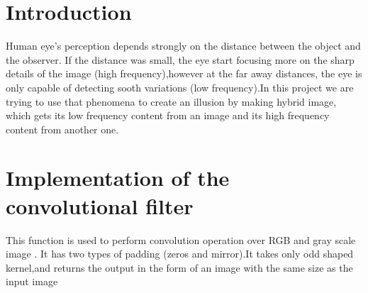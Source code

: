 \lstset{style=mystyle, language=python , frame=single}



\maketitle	

\vspace{-3cm}
\thispagestyle{fancy}


\section*{Introduction}


Human eye's perception depends strongly on the distance between the object and the observer. If the distance was small, the eye start focusing more on the sharp details of the image (high frequency),however at the far away distances, the eye is only capable of detecting sooth variations (low frequency).In this project we are trying to use that phenomena to create an illusion by making hybrid image, which gets its low frequency content from an image and its high frequency content from another one.


\section*{Implementation of the convolutional filter}

This function is used to perform convolution operation over RGB and gray scale image . It has two types of padding (zeros and mirror).It takes only odd shaped kernel,and returns the output in the form of an image with the same size as the input image

